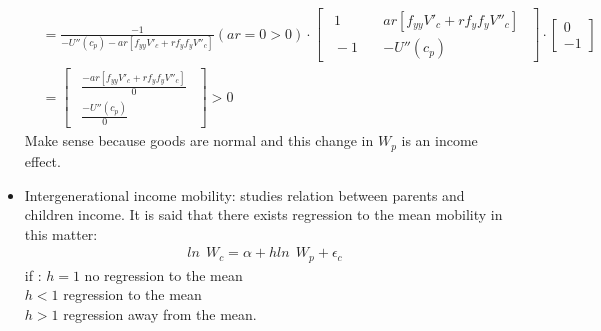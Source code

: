 \documentclass[14pt,notitlepage]{article}
\begin{document}
\begin{itemize}
\begin{align*}
              &= \frac{-1}{-U''(c_p) - a r [f_{yy} V'_c + r f_y f_y V''_c]}(a r = 0 > 0) \cdot \begin{bmatrix}
                                                                                                    \ \ 1 \quad &a r [f_{yy} V'_c + r f_y f_y V''_c]\ \ \\
                                                                                                    \ \ -1 \quad &-U''(c_p)\ \
                                                                                                \end{bmatrix} \cdot \begin{bmatrix}
                                                                                                    0 \\
                                                                                                    -1
                                                                                                \end{bmatrix} \\
              &= \begin{bmatrix}
                    \ \ \frac{- a r [f_{yy} V'_c + r f_y f_y V''_c]}{0}\ \ \\
                    \ \ \frac{-U''(c_p)}{0}\ \
                 \end{bmatrix} > 0
\end{align*}
Make sense because goods are normal and this change in $W_p$ is an income effect.

\item Intergenerational income mobility: studies relation between parents and children income.
It is said that there exists regression to the mean mobility in this matter:
\begin{align*}
ln\ \ W_c = \alpha + h ln\ \ W_p + \epsilon_c
\end{align*}
if : \quad $h=1$ no regression to the mean \\
$h<1$ regression to the mean \\
$h>1$ regression away from the mean.


\end{itemize}
\end{document}
